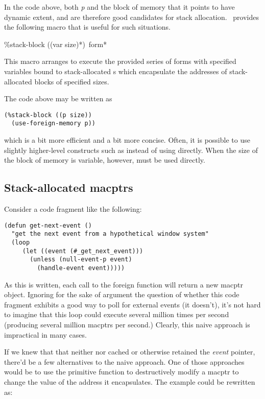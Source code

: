 In the code above, both {\it p} and the block of memory that it points
to have dynamic extent, and are therefore good candidates for stack
allocation.  \CCL\ provides the following macro that is useful for
such situations.

\begin{defun}[Macro]
\%stack-block ((var size)*) {\,form}*

This macro arranges to execute the provided series of forms with
specified variables bound to stack-allocated s which
encapsulate the addresses of stack-allocated blocks of specified
sizes.

The code above may be written as

\begin{lstlisting}
(%stack-block ((p size))
  (use-foreign-memory p))
\end{lstlisting}

which is a bit more efficient and a bit more concise.  Often, it is
possible to use slightly higher-level constructs such as 
instead of using  directly.  When the size of the
block of memory is variable, however,  must be
used directly.
\end{defun}

\subsection{Stack-allocated macptrs}

Consider a code fragment like the following:

\begin{lstlisting}
(defun get-next-event ()
  "get the next event from a hypothetical window system"
  (loop
     (let ((event (#_get_next_event)))
       (unless (null-event-p event)
         (handle-event event)))))
\end{lstlisting}

As this is written, each call to the foreign function
 will return a new macptr object.  Ignoring
for the sake of argument the question of whether this code fragment
exhibits a good way to poll for external events (it doesn't), it's not
hard to imagine that this loop could execute several million times per
second (producing several million macptrs per second.)  Clearly, this
naive approach is impractical in many cases.

If we knew that that neither  nor 
cached or otherwise retained the {\it event} pointer, there'd be a few
alternatives to the naive approach. One of those approaches would be
to use the primitive function  to destructively
modify a macptr to change the value of the address it encapsulates.
The  example could be rewritten as:

